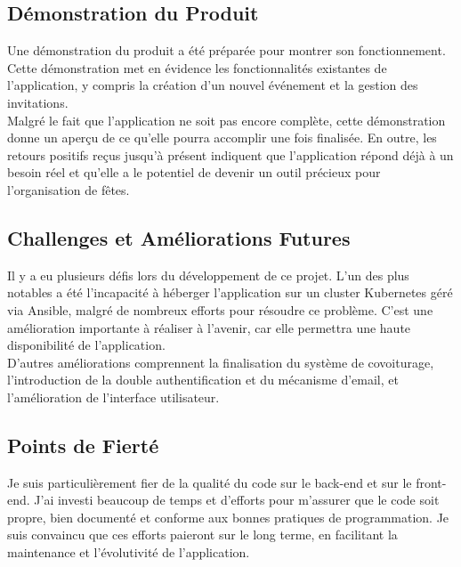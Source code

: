 \subsection{Démonstration du Produit}\label{subsec:demonstration-du-produit}

Une démonstration du produit a été préparée pour montrer son fonctionnement.
Cette démonstration met en évidence les fonctionnalités existantes de l'application, y compris la création d'un nouvel événement et la gestion des invitations.\\

Malgré le fait que l'application ne soit pas encore complète, cette démonstration donne un aperçu de ce qu'elle pourra accomplir une fois finalisée.
En outre, les retours positifs reçus jusqu'à présent indiquent que l'application répond déjà à
un besoin réel et qu'elle a le potentiel de devenir un outil précieux pour l'organisation de fêtes.

\subsection{Challenges et Améliorations Futures}\label{subsec:challenges-et-ameliorations-futures}

Il y a eu plusieurs défis lors du développement de ce projet.
L'un des plus notables a été l'incapacité à héberger l'application sur un cluster Kubernetes géré via Ansible,
malgré de nombreux efforts pour résoudre ce problème.
C'est une amélioration importante à réaliser à l'avenir, car elle permettra une haute disponibilité de l'application.\\

D'autres améliorations comprennent la finalisation du système de covoiturage, l'introduction de la double authentification et du mécanisme d'email,
et l'amélioration de l'interface utilisateur.

\subsection{Points de Fierté}\label{subsec:points-de-fierte}

Je suis particulièrement fier de la qualité du code sur le back-end et sur le front-end.
J'ai investi beaucoup de temps et d'efforts pour m'assurer que le code soit propre, bien documenté et conforme aux bonnes pratiques de programmation.
Je suis convaincu que ces efforts paieront sur le long terme, en facilitant la maintenance et l'évolutivité de l'application.